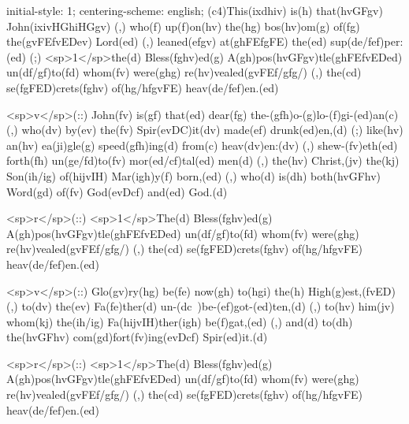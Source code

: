 initial-style: 1;
centering-scheme: english;
(c4)This(ixdhiv) is(h) that(hvGFgv) John(ixivHGhiHGgv) (,) who(f) up(f)on(hv) the(hg) bos(hv)om(g) of(fg) the(gvFEfvEDev) Lord(ed) (,) leaned(efgv) at(ghFEfgFE) the(ed) sup(de/fef)per:(ed) (;) <sp>1</sp>the(d) Bless(fghv)ed(g) A(gh)pos(hvGFgv)tle(ghFEfvEDed) un(df/gf)to(fd) whom(fv) were(ghg) re(hv)vealed(gvFEf/gfg/) (,) the(cd) se(fgFED)crets(fghv) of(hg/hfgvFE) heav(de/fef)en.(ed) 

<sp>v</sp>(::) John(fv) is(gf) that(ed) dear(fg) the-(gfh)o-(g)lo-(f)gi-(ed)an(c) (,) who(dv) by(ev) the(fv) Spir(evDC)it(dv) made(ef) drunk(ed)en,(d) (;) like(hv) an(hv) ea(ji)gle(g) speed(gfh)ing(d) from(c) heav(dv)en:(dv) (,) shew-(fv)eth(ed) forth(fh) un(ge/fd)to(fv) mor(ed/cf)tal(ed) men(d) (,) the(hv) Christ,(jv) the(kj) Son(ih/ig) of(hijvIH) Mar(igh)y(f) born,(ed) (,) who(d) is(dh) both(hvGFhv) Word(gd) of(fv) God(evDcf) and(ed) God.(d)

<sp>r</sp>(::) <sp>1</sp>The(d) Bless(fghv)ed(g) A(gh)pos(hvGFgv)tle(ghFEfvEDed) un(df/gf)to(fd) whom(fv) were(ghg) re(hv)vealed(gvFEf/gfg/) (,) the(cd) se(fgFED)crets(fghv) of(hg/hfgvFE) heav(de/fef)en.(ed) 

<sp>v</sp>(::) Glo(gv)ry(hg) be(fe) now(gh) to(hgi) the(h) High(g)est,(fvED) (,) to(dv) the(ev) Fa(fe)ther(d) un-(dc~)be-(ef)got-(ed)ten,(d) (,) to(hv) him(jv) whom(kj) the(ih/ig) Fa(hijvIH)ther(igh) be(f)gat,(ed) (,) and(d) to(dh) the(hvGFhv) com(gd)fort(fv)ing(evDcf) Spir(ed)it.(d)

<sp>r</sp>(::) <sp>1</sp>The(d) Bless(fghv)ed(g) A(gh)pos(hvGFgv)tle(ghFEfvEDed) un(df/gf)to(fd) whom(fv) were(ghg) re(hv)vealed(gvFEf/gfg/) (,) the(cd) se(fgFED)crets(fghv) of(hg/hfgvFE) heav(de/fef)en.(ed) 